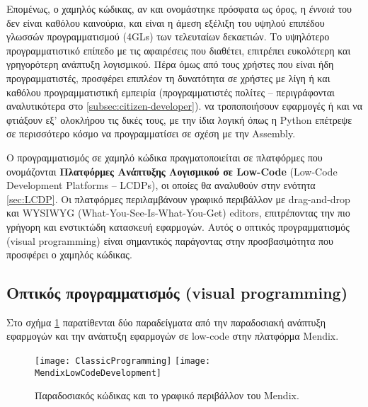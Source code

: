         Επομένως, ο χαμηλός κώδικας, αν και ονομάστηκε πρόσφατα ως όρος, η \textit{έννοιά} του δεν είναι καθόλου καινούρια, και είναι η άμεση εξέλιξη του υψηλού επιπέδου γλωσσών προγραμματισμού (4GLs) των τελευταίων δεκαετιών. Το υψηλότερο προγραμματιστικό επίπεδο με τις αφαιρέσεις που διαθέτει, επιτρέπει ευκολότερη και γρηγορότερη ανάπτυξη λογισμικού. Πέρα όμως από τους χρήστες που είναι ήδη προγραμματιστές, προσφέρει επιπλέον τη δυνατότητα σε χρήστες με λίγη ή και καθόλου προγραμματιστική εμπειρία (προγραμματιστές πολίτες -- περιγράφονται αναλυτικότερα στο \ref{subsec:citizen-developer}). να τροποποιήσουν εφαρμογές ή και να φτιάξουν εξ' ολοκλήρου τις δικές τους, με την ίδια λογική όπως η Python επέτρεψε σε περισσότερο κόσμο να προγραμματίσει σε σχέση με την Assembly.

        Ο προγραμματισμός σε χαμηλό κώδικα πραγματοποιείται σε πλατφόρμες που ονομάζονται \textbf{Πλατφόρμες Ανάπτυξης Λογισμικού σε Low-Code} (Low-Code Development Platforms -- LCDPs), οι οποίες θα αναλυθούν στην ενότητα \ref{sec:LCDP}. Οι πλατφόρμες περιλαμβάνουν γραφικό περιβάλλον με drag-and-drop και WYSIWYG (What-You-See-Is-What-You-Get) editors, επιτρέποντας την πιο γρήγορη και ενστικτώδη κατασκευή εφαρμογών. Αυτός ο οπτικός προγραμματισμός (visual programming) είναι σημαντικός παράγοντας στην προσβασιμότητα που προσφέρει ο χαμηλός κώδικας. \cite{LowCodeMendix} \cite{LowCodeSimon} \cite{LowCodeDemocratization}

            \subsection{Οπτικός προγραμματισμός (visual programming)}
                Στο σχήμα \ref{fig:codevsmendix} παρατίθενται δύο παραδείγματα από την παραδοσιακή ανάπτυξη εφαρμογών και την ανάπτυξη εφαρμογών σε low-code στην πλατφόρμα Mendix.

                \begin{figure}[h!] \noindent
                        \texttt{[image: ClassicProgramming]}
                        \texttt{[image: MendixLowCodeDevelopment]}
                        \caption{Παραδοσιακός κώδικας και το γραφικό περιβάλλον του Mendix.}
                        \label{fig:codevsmendix}
                \end{figure}

